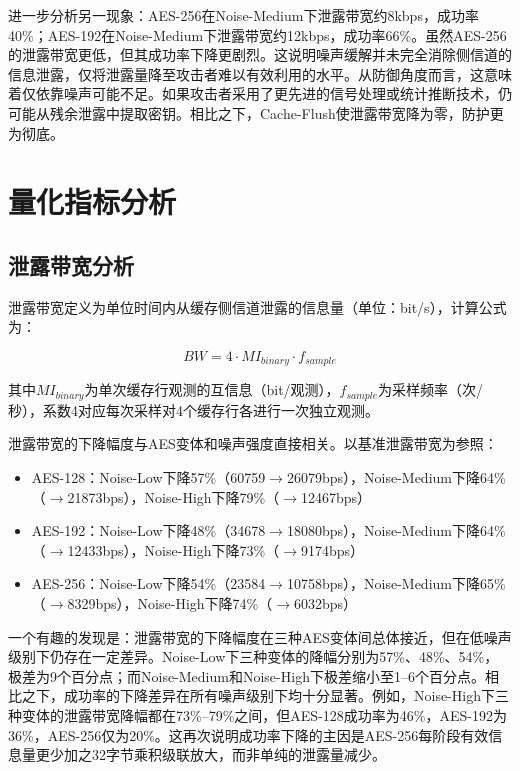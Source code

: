进一步分析另一现象：AES-256在Noise-Medium下泄露带宽约8kbps，成功率40\%；AES-192在Noise-Medium下泄露带宽约12kbps，成功率66\%。虽然AES-256的泄露带宽更低，但其成功率下降更剧烈。这说明噪声缓解并未完全消除侧信道的信息泄露，仅将泄露量降至攻击者难以有效利用的水平。从防御角度而言，这意味着仅依靠噪声可能不足。如果攻击者采用了更先进的信号处理或统计推断技术，仍可能从残余泄露中提取密钥。相比之下，Cache-Flush使泄露带宽降为零，防护更为彻底。

\section{量化指标分析}

\subsection{泄露带宽分析}

泄露带宽定义为单位时间内从缓存侧信道泄露的信息量（单位：bit/s），计算公式为：

\begin{equation}
BW = 4 \cdot MI_{binary} \cdot f_{sample}
\end{equation}

其中$MI_{binary}$为单次缓存行观测的互信息（bit/观测），$f_{sample}$为采样频率（次/秒），系数4对应每次采样对4个缓存行各进行一次独立观测。

泄露带宽的下降幅度与AES变体和噪声强度直接相关。以基准泄露带宽为参照：

\begin{itemize}
    \item AES-128：Noise-Low下降57\%（60759$\to$26079bps），Noise-Medium下降64\%（$\to$21873bps），Noise-High下降79\%（$\to$12467bps）
    \item AES-192：Noise-Low下降48\%（34678$\to$18080bps），Noise-Medium下降64\%（$\to$12433bps），Noise-High下降73\%（$\to$9174bps）
    \item AES-256：Noise-Low下降54\%（23584$\to$10758bps），Noise-Medium下降65\%（$\to$8329bps），Noise-High下降74\%（$\to$6032bps）
\end{itemize}

一个有趣的发现是：泄露带宽的下降幅度在三种AES变体间总体接近，但在低噪声级别下仍存在一定差异。Noise-Low下三种变体的降幅分别为57\%、48\%、54\%，极差为9个百分点；而Noise-Medium和Noise-High下极差缩小至1--6个百分点。相比之下，成功率的下降差异在所有噪声级别下均十分显著。例如，Noise-High下三种变体的泄露带宽降幅都在73\%--79\%之间，但AES-128成功率为46\%，AES-192为36\%，AES-256仅为20\%。这再次说明成功率下降的主因是AES-256每阶段有效信息量更少加之32字节乘积级联放大，而非单纯的泄露量减少。

